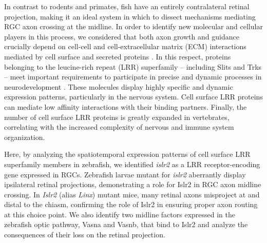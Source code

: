 In contrast to rodents and primates, fish have an entirely contralateral retinal projection, making it an ideal system in which to dissect mechanisms mediating RGC axon crossing at the midline.
In order to identify new molecular and cellular players in this process, we considered that both axon growth and guidance crucially depend on cell-cell and cell-extracellular matrix (ECM) interactions mediated by cell surface and secreted proteins
\cite{raper2010cellular}.
In this respect, proteins belonging to the leucine-rich repeat (LRR) superfamily – including Slits and Trks – meet important requirements to participate in precise and dynamic processes in neurodevelopment \cite{de2011role}.
These molecules display highly specific and dynamic expression patterns, particularly in the nervous system.
Cell surface LRR proteins can mediate low affinity interactions with their binding partners.
Finally, the number of cell surface LRR proteins is greatly expanded in vertebrates, correlating with the increased complexity of nervous and immune system organization.

Here, by analyzing the spatiotemporal expression patterns of cell surface LRR superfamily members in zebrafish, we identified \emph{islr2} as a LRR receptor-encoding gene expressed in RGCs.
Zebrafish larvae mutant for \emph{islr2} aberrantly display ipsilateral retinal projections, demonstrating a role for Islr2 in RGC axon midline crossing.
In \emph{Islr2} (alias \emph{Linx}) mutant mice, many retinal axons misproject at and distal to the chiasm, confirming the role of Islr2 in ensuring proper axon routing at this choice point.
We also identify two midline factors expressed in the zebrafish optic pathway, Vasna and Vasnb, that bind to Islr2 and analyze the consequences of their loss on the retinal projection.